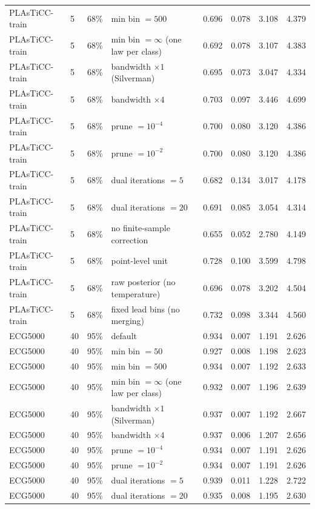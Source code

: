 \begin{longtable}{lllp{4.2cm}cccc}
PLAsTiCC-train & 5 & 68\% & min bin $= 500$ & 0.696 & 0.078 & 3.108 & 4.379 \\
PLAsTiCC-train & 5 & 68\% & min bin $= \infty$ (one law per class) & 0.692 & 0.078 & 3.107 & 4.383 \\
PLAsTiCC-train & 5 & 68\% & bandwidth $\times 1$ (Silverman) & 0.695 & 0.073 & 3.047 & 4.334 \\
PLAsTiCC-train & 5 & 68\% & bandwidth $\times 4$ & 0.703 & 0.097 & 3.446 & 4.699 \\
PLAsTiCC-train & 5 & 68\% & prune $= 10^{-4}$ & 0.700 & 0.080 & 3.120 & 4.386 \\
PLAsTiCC-train & 5 & 68\% & prune $= 10^{-2}$ & 0.700 & 0.080 & 3.120 & 4.386 \\
PLAsTiCC-train & 5 & 68\% & dual iterations $= 5$ & 0.682 & 0.134 & 3.017 & 4.178 \\
PLAsTiCC-train & 5 & 68\% & dual iterations $= 20$ & 0.691 & 0.085 & 3.054 & 4.314 \\
PLAsTiCC-train & 5 & 68\% & no finite-sample correction & 0.655 & 0.052 & 2.780 & 4.149 \\
PLAsTiCC-train & 5 & 68\% & point-level unit & 0.728 & 0.100 & 3.599 & 4.798 \\
PLAsTiCC-train & 5 & 68\% & raw posterior (no temperature) & 0.696 & 0.078 & 3.202 & 4.504 \\
PLAsTiCC-train & 5 & 68\% & fixed lead bins (no merging) & 0.732 & 0.098 & 3.344 & 4.560 \\
ECG5000 & 40 & 95\% & default & 0.934 & 0.007 & 1.191 & 2.626 \\
ECG5000 & 40 & 95\% & min bin $= 50$ & 0.927 & 0.008 & 1.198 & 2.623 \\
ECG5000 & 40 & 95\% & min bin $= 500$ & 0.934 & 0.007 & 1.192 & 2.633 \\
ECG5000 & 40 & 95\% & min bin $= \infty$ (one law per class) & 0.932 & 0.007 & 1.196 & 2.639 \\
ECG5000 & 40 & 95\% & bandwidth $\times 1$ (Silverman) & 0.937 & 0.007 & 1.192 & 2.667 \\
ECG5000 & 40 & 95\% & bandwidth $\times 4$ & 0.937 & 0.006 & 1.207 & 2.656 \\
ECG5000 & 40 & 95\% & prune $= 10^{-4}$ & 0.934 & 0.007 & 1.191 & 2.626 \\
ECG5000 & 40 & 95\% & prune $= 10^{-2}$ & 0.934 & 0.007 & 1.191 & 2.626 \\
ECG5000 & 40 & 95\% & dual iterations $= 5$ & 0.939 & 0.011 & 1.228 & 2.722 \\
ECG5000 & 40 & 95\% & dual iterations $= 20$ & 0.935 & 0.008 & 1.195 & 2.630 \\

\end{longtable}

